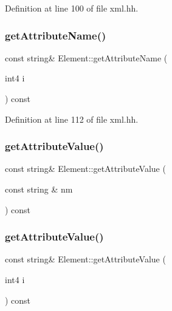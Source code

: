 Definition at line 100 of file xml.\+hh.

\mbox{\label{class_element_a008a28024c815531ef73e1041555ca28}} 
\subsubsection{\texorpdfstring{getAttributeName()}{getAttributeName()}}
{\footnotesize\ttfamily const string\& Element\+::get\+Attribute\+Name (\begin{DoxyParamCaption}\item[{int4}]{i }\end{DoxyParamCaption}) const\hspace{0.3cm}{\ttfamily [inline]}}



Definition at line 112 of file xml.\+hh.

\mbox{\label{class_element_aa7c399eff3cfca934ee7fb9cc559d039}} 
\subsubsection{\texorpdfstring{getAttributeValue()}{getAttributeValue()}\hspace{0.1cm}{\footnotesize\ttfamily [1/2]}}
{\footnotesize\ttfamily const string\& Element\+::get\+Attribute\+Value (\begin{DoxyParamCaption}\item[{const string \&}]{nm }\end{DoxyParamCaption}) const}

\mbox{\label{class_element_a24bda497430edf8e801ec22f17f1dc88}} 
\subsubsection{\texorpdfstring{getAttributeValue()}{getAttributeValue()}\hspace{0.1cm}{\footnotesize\ttfamily [2/2]}}
{\footnotesize\ttfamily const string\& Element\+::get\+Attribute\+Value (\begin{DoxyParamCaption}\item[{int4}]{i }\end{DoxyParamCaption}) const\hspace{0.3cm}{\ttfamily [inline]}}



